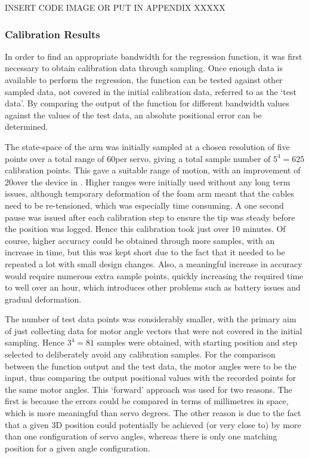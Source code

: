 \documentclass[11pt]{article}
\begin{document}
INSERT CODE IMAGE OR PUT IN APPENDIX XXXXX	


\subsubsection{Calibration Results}
In order to find an appropriate bandwidth for the regression function, it was first necessary to obtain calibration data through sampling. Once enough data is available to perform the regression, the function can be tested against other sampled data, not covered in the initial calibration data, referred to as the `test data'. By comparing the output of the function for different bandwidth values against the values of the test data, an absolute positional error can be determined. 

The state-space of the arm was initially sampled at a chosen resolution of five points over a total range of 60\degree per servo, giving a total sample number of $5^4 = 625$ calibration points. This gave a suitable range of motion, with an improvement of 20\degree over the device in \cite{GreggSmithDesign}. Higher ranges were initially used without any long term issues, although temporary deformation of the foam arm meant that the cables need to be re-tensioned, which was especially time consuming. A one second pause was issued after each calibration step to ensure the tip was steady before the position was logged. Hence this calibration took just over 10 minutes. Of course, higher accuracy could be obtained through more samples, with an increase in time, but this was kept short due to the fact that it needed to be repeated a lot with small design changes. Also, a meaningful increase in accuracy would require numerous extra sample points, quickly increasing the required time to well over an hour, which introduces other problems such as battery issues and gradual deformation. 

The number of test data points was considerably smaller, with the primary aim of just collecting data for motor angle vectors that were not covered in the initial sampling. Hence $3^4 = 81$ samples were obtained, with starting position and step selected to deliberately avoid any calibration samples. For the comparison between the function output and the test data, the motor angles were to be the input, thus comparing the output positional values with the recorded points for the same motor angles. This `forward' approach was used for two reasons. The first is because the errors could be compared in terms of millimetres in space, which is more meaningful than servo degrees. The other reason is due to the fact that a given 3D position could potentially be achieved (or very close to) by more than one configuration of servo angles, whereas there is only one matching position for a given angle configuration. 
\end{document}
